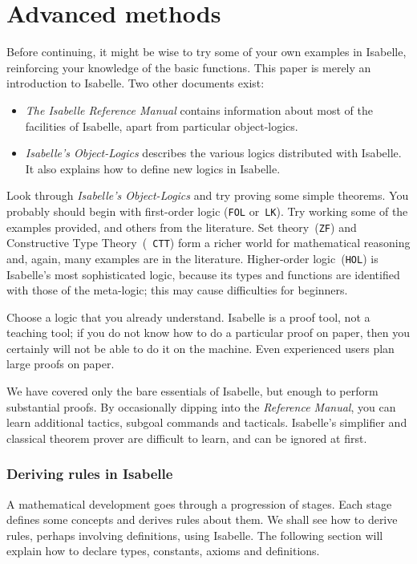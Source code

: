 \part{Advanced methods}
Before continuing, it might be wise to try some of your own examples in
Isabelle, reinforcing your knowledge of the basic functions.
This paper is merely an introduction to Isabelle.  Two other documents
exist:
\begin{itemize}
  \item {\em The Isabelle Reference Manual\/} contains information about
most of the facilities of Isabelle, apart from particular object-logics.

  \item {\em Isabelle's Object-Logics\/} describes the various logics
distributed with Isabelle.  It also explains how to define new logics in
Isabelle.
\end{itemize}
Look through {\em Isabelle's Object-Logics\/} and try proving some simple
theorems.  You probably should begin with first-order logic ({\tt FOL}
or~{\tt LK}).  Try working some of the examples provided, and others from
the literature.  Set theory~({\tt ZF}) and Constructive Type Theory~({\tt
  CTT}) form a richer world for mathematical reasoning and, again, many
examples are in the literature.  Higher-order logic~({\tt HOL}) is
Isabelle's most sophisticated logic, because its types and functions are
identified with those of the meta-logic; this may cause difficulties for
beginners.

Choose a logic that you already understand.  Isabelle is a proof
tool, not a teaching tool; if you do not know how to do a particular proof
on paper, then you certainly will not be able to do it on the machine.
Even experienced users plan large proofs on paper.

We have covered only the bare essentials of Isabelle, but enough to perform
substantial proofs.  By occasionally dipping into the {\em Reference
Manual}, you can learn additional tactics, subgoal commands and tacticals.
Isabelle's simplifier and classical theorem prover are
difficult to learn, and can be ignored at first.


\section{Deriving rules in Isabelle}
A mathematical development goes through a progression of stages.  Each
stage defines some concepts and derives rules about them.  We shall see how
to derive rules, perhaps involving definitions, using Isabelle.  The
following section will explain how to declare types, constants, axioms and
definitions.



